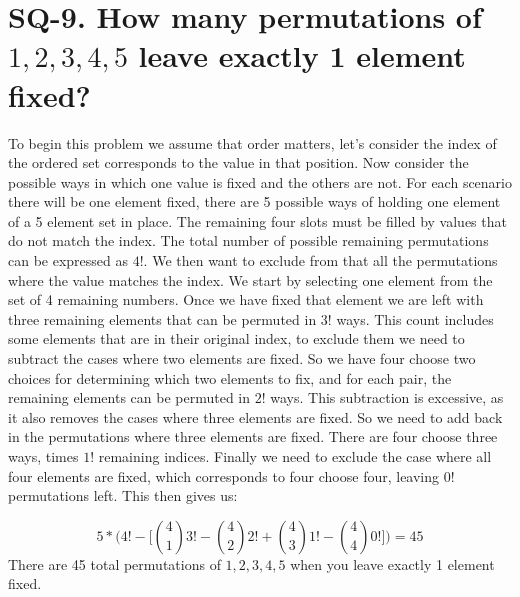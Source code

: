 \documentclass{article}
\begin{document}
\newpage
\section*{SQ-9. How many permutations of ${1,2,3,4,5}$ leave exactly 1 element fixed?}
To begin this problem we assume that order matters, let's consider the index of the ordered set corresponds to the value in that position. Now consider the possible ways in which one value is fixed and the others are not. For each scenario there will be one element fixed, there are 5 possible ways of holding one element of a 5 element set in place. The remaining four slots must be filled by values that do not match the index. The total number of possible remaining permutations can be expressed as $4!$. We then want to exclude from that all the permutations where the value matches the index. We start by selecting one element from the set of 4 remaining numbers. Once we have fixed that element we are left with three remaining elements that can be permuted in $3!$ ways. This count includes some elements that are in their original index, to exclude them we need to subtract the cases where two elements are fixed. So we have four choose two choices for determining which two elements to fix, and for each pair, the remaining elements can be permuted in $2!$ ways. This subtraction is excessive, as it also removes the cases where three elements are fixed. So we need to add back in the permutations where three elements are fixed. There are four choose three ways, times $1!$ remaining indices. Finally we need to exclude the case where all four elements are fixed, which corresponds to four choose four, leaving $0!$ permutations left. This then gives us:

$$5*\Big(4! - \Big[\binom{4}{1}3! - \binom{4}{2}2! + \binom{4}{3}1!-\binom{4}{4}0!\Big]\Big) = 45$$
There are 45 total permutations of ${1,2,3,4,5}$ when you leave exactly 1 element fixed.
\end{document}
